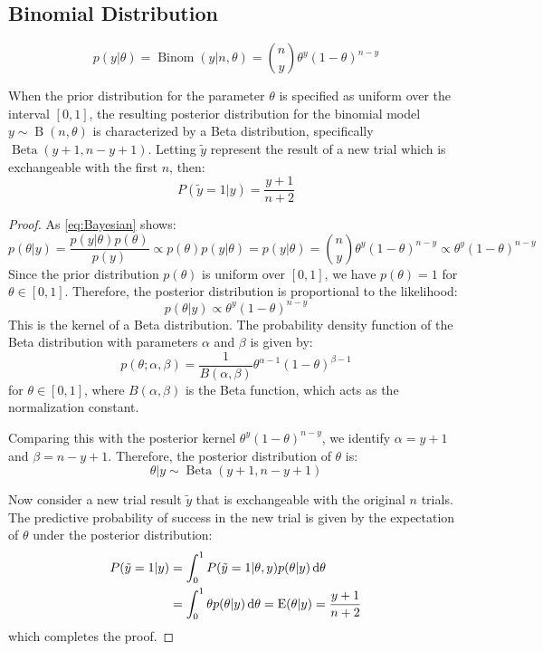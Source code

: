 \subsection{Binomial Distribution}
\begin{equation*}
	p(y|\theta)=\operatorname{Binom}(y|n,\theta)=\binom{n}{y}\theta^y(1-\theta)^{n-y}
\end{equation*}
\begin{theorem}
	When the prior distribution for the parameter $\theta$ is specified as uniform over the interval $[0,1]$, the resulting posterior distribution for the binomial model $y\sim\operatorname{B}(n,\theta)$ is characterized by a Beta distribution, specifically $\operatorname{Beta}(y+1, n-y+1)$. Letting $\tilde{y}$ represent the result of a new trial which is exchangeable with the first $n$, then:
	\begin{equation*}
		P(\tilde{y}=1| y)=\frac{y+1}{n+2}
	\end{equation*}
\end{theorem}
\begin{proof}
	As \cref{eq:Bayesian} shows:
	\begin{equation*}
		p(\theta | y) = \frac{p(y | \theta) p(\theta)}{p(y)} \propto p(\theta) p(y | \theta) = p(y | \theta) = \binom{n}{y} \theta^y (1 - \theta)^{n - y} \propto \theta^y (1 - \theta)^{n - y}
	\end{equation*}
	Since the prior distribution $p(\theta)$ is uniform over $[0,1]$, we have $p(\theta) = 1$ for $\theta \in [0,1]$. Therefore, the posterior distribution is proportional to the likelihood:
	\[
	p(\theta | y) \propto \theta^y(1 - \theta)^{n - y}
	\]
	This is the kernel of a Beta distribution. The probability density function of the Beta distribution with parameters $\alpha$ and $\beta$ is given by:
	\[
	p(\theta ; \alpha, \beta) = \frac{1}{B(\alpha, \beta)} \theta^{\alpha - 1} (1 - \theta)^{\beta - 1}
	\]
	for $\theta \in [0,1]$, where $B(\alpha, \beta)$ is the Beta function, which acts as the normalization constant.
	
	Comparing this with the posterior kernel $\theta^y(1 - \theta)^{n - y}$, we identify $\alpha = y + 1$ and $\beta = n - y + 1$. Therefore, the posterior distribution of $\theta$ is:
	\[
	\theta | y \sim \operatorname{Beta}(y + 1, n - y + 1)
	\]
	
	Now consider a new trial result $\tilde{y}$ that is exchangeable with the original $n$ trials. The predictive probability of success in the new trial is given by the expectation of $\theta$ under the posterior distribution:
	\begin{align*}
		P(\tilde{y} = 1 | y) &= \int_0^1 P(\tilde{y} = 1 | \theta, y)p(\theta | y)\mathop{}\!\mathrm{d}\theta \\
		&= \int_0^1 \theta p(\theta | y)\mathop{}\!\mathrm{d}\theta = \operatorname{E}(\theta | y) = \frac{y + 1}{n + 2}
	\end{align*}
	which completes the proof.
\end{proof}
